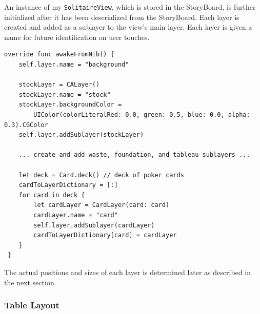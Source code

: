 \documentclass[11pt]{article}
\begin{document}
An instance of my {\tt SolitaireView}, which is stored in the StoryBoard, is
further initialized after it has been deserialized from the StoryBoard.
Each layer is created and added as a sublayer to the view's main layer.
Each layer is given a name for future identification on user touches.
\begin{verbatim}
override func awakeFromNib() {
    self.layer.name = "background"
      
    stockLayer = CALayer()
    stockLayer.name = "stock"
    stockLayer.backgroundColor = 
        UIColor(colorLiteralRed: 0.0, green: 0.5, blue: 0.0, alpha: 0.3).CGColor
    self.layer.addSublayer(stockLayer)
    
    ... create and add waste, foundation, and tableau sublayers ...
    
    let deck = Card.deck() // deck of poker cards
    cardToLayerDictionary = [:]
    for card in deck {
        let cardLayer = CardLayer(card: card)
        cardLayer.name = "card"
        self.layer.addSublayer(cardLayer)
        cardToLayerDictionary[card] = cardLayer
    }
 }
\end{verbatim}
The actual positions and sizes of each layer is determined later
as described in the next section.


\subsubsection{Table Layout}
\end{document}
